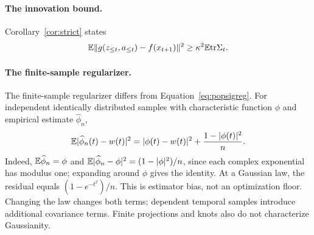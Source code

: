 \paragraph{The innovation bound.} Corollary~\ref{cor:strict} states
\begin{equation}
\label{eq:innovation}
\mathbb{E}\|g(z_{\le t},a_{\le t})-f(x_{t+1})\|^2
\ge \kappa^2\mathbb{E}\mathrm{tr}\Sigma_t .
\end{equation}

\paragraph{The finite-sample regularizer.}
The finite-sample regularizer differs from Equation~\ref{eq:popsigreg}.
For independent identically distributed samples with characteristic function $\phi$ and empirical estimate $\widehat\phi_n$,
\begin{equation}
\mathbb{E}|\widehat\phi_n(t)-w(t)|^2
=|\phi(t)-w(t)|^2+\frac{1-|\phi(t)|^2}{n}.
\end{equation}
Indeed, $\mathbb{E}\widehat\phi_n=\phi$ and $\mathbb{E}|\widehat\phi_n-\phi|^2=(1-|\phi|^2)/n$, since each complex exponential has modulus one; expanding around $\phi$ gives the identity.
At a Gaussian law, the residual equals $(1-e^{-t^2})/n$.
This is estimator bias, not an optimization floor.
Changing the law changes both terms; dependent temporal samples introduce additional covariance terms.
Finite projections and knots also do not characterize Gaussianity.


